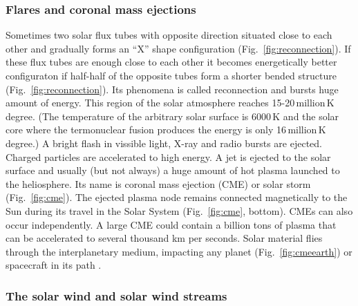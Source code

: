 \documentclass[sn-aps]{sn-jnl}%
\begin{document}
\subsubsection{Flares and coronal mass ejections}
\label{sec:cme}

Sometimes two solar flux tubes with opposite direction situated close to each other and gradually forms an ``X'' shape configuration (Fig.~\ref{fig:reconnection}). If these flux tubes are enough close to each other it becomes energetically better configuraton if half-half of the opposite tubes form a shorter bended structure (Fig.~\ref{fig:reconnection}). Its phenomena is called reconnection and bursts huge amount of energy. This region of the solar atmosphere reaches 15-20\,million\,K degree. (The temperature of the arbitrary solar surface is 6000\,K and the solar core where the termonuclear fusion produces the energy is only 16\,million\,K degree.) A bright flash in vissible light, X-ray and radio bursts are ejected. Charged particles are accelerated to high energy. A jet is ejected to the solar surface and usually (but not always) a huge amount of hot plasma launched to the heliosphere. Its name is coronal mass ejection (CME) or solar storm (Fig.~\ref{fig:cme}). The ejected plasma node remains connected magnetically to the Sun during its travel in the Solar System (Fig.~\ref{fig:cme}, bottom). CMEs can also occur independently. A large CME could contain a billion tons of plasma that can be accelerated to several thousand km per seconds. Solar material flies through the interplanetary medium, impacting any planet (Fig.~\ref{fig:cmeearth}) or spacecraft in its path \cite{scherer05:_space_weath,stix04:_sun_introd}.

\subsubsection{The solar wind and solar wind streams}
\label{sec:sw}
\end{document}
